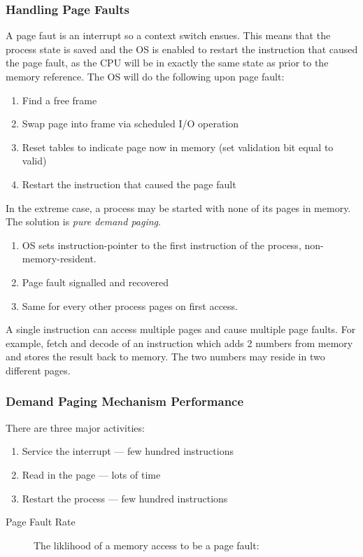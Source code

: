 \documentclass{article}%
\begin{document}
\subsubsection{Handling Page Faults}
\label{sec:orgadd5f8d}
A page faut is an interrupt so a context switch ensues.
This means that the process state is saved and the OS is enabled to restart the instruction that caused the page fault, as the CPU will be in exactly the same state as prior to the memory reference.
The OS will do the following upon page fault:
\begin{enumerate}
\item Find a free frame
\item Swap page into frame via scheduled I/O operation
\item Reset tables to indicate page now in memory (set validation bit equal to valid)
\item Restart the instruction that caused the page fault
\end{enumerate}
In the extreme case, a process may be started with none of its pages in memory.
The solution is \emph{pure demand paging}.
\begin{enumerate}
\item OS sets instruction-pointer to the first instruction of the process, non-memory-resident.
\item Page fault signalled and recovered
\item Same for every other process pages on first access.
\end{enumerate}
A single instruction can access multiple pages and cause multiple page faults.
For example, fetch and decode of an instruction which adds 2 numbers from memory and stores the result back to memory.
The two numbers may reside in two different pages.
\subsubsection{Demand Paging Mechanism Performance}
\label{sec:org7e209f6}
There are three major activities:
\begin{enumerate}
\item Service the interrupt --- few hundred instructions
\item Read in the page --- lots of time
\item Restart the process --- few hundred instructions
\end{enumerate}


\begin{description}
\item[{Page Fault Rate}] The liklihood of a memory access to be a page fault:
\end{description}
\end{document}
